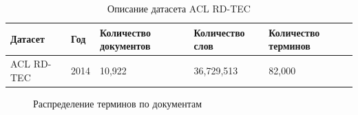 \documentclass[a4paper, 12pt]{article}
\begin{document}
 \begin{table}[t]%
    \caption{Описание датасета ACL RD-TEC}
    \label{table:Dataset}
    \centering\medskip%
    \begin{tabular}{| p{75 pt} | p{50 pt} | p{70 pt} | p{70 pt} | p{70 pt} |}
    \hline
        Датасет
            & Год
            & Количество документов
            & Количество слов
            & Количество терминов \\ \hline
        ACL RD-TEC
            & 2014
            & 10,922
            & 36,729,513
            & 82,000 \\
    \hline
    \end{tabular}
\end{table}

\begin{figure}[!ht]
    \caption{Распределение терминов по документам}
    \label{fg:Dataset}
\end{figure}
\end{document}
